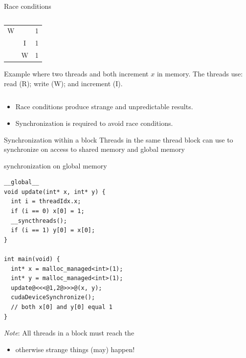 \documentclass[aspectratio=43]{beamer}
\begin{document}
\begin{frame}[fragile]{Race conditions}
\begin{columns}[T]
\begin{column}[T]{0.55\textwidth}
\begin{center}
\begin{tabular}[]{|ccc|}
              W   &      &  1\\
                  &  I   &  1\\
                  &  W   &  1\\
            \hline
        \end{tabular}
        \end{center}
        \begin{center}
            \scriptsize
            Example where two threads  and  both increment $x$ in memory. The threads use: read (R); write (W); and increment (I).
        \end{center}
    \end{column}
\end{columns}

    \begin{itemize}
        \item Race conditions produce strange and unpredictable results.
        \item Synchronization is required to avoid race conditions.
    \end{itemize}
\end{frame}


\begin{frame}[fragile]{Synchronization within a block}
    Threads in the same thread block can use  to synchronize on access to shared memory and global memory

    \begin{code}{synchronization on global memory}
        \begin{lstlisting}[style=boxcudatiny]
__global__
void update(int* x, int* y) {
  int i = threadIdx.x;
  if (i == 0) x[0] = 1;
  __syncthreads();
  if (i == 1) y[0] = x[0];
}

int main(void) {
  int* x = malloc_managed<int>(1);
  int* y = malloc_managed<int>(1);
  update@<<<@1,2@>>>@(x, y);
  cudaDeviceSynchronize();
  // both x[0] and y[0] equal 1
}
        \end{lstlisting}
    \end{code}

    \emph{Note}: All threads in a block must reach the 
    \begin{itemize}
        \item otherwise strange things (may) happen!
    \end{itemize}
\end{frame}
\end{document}
